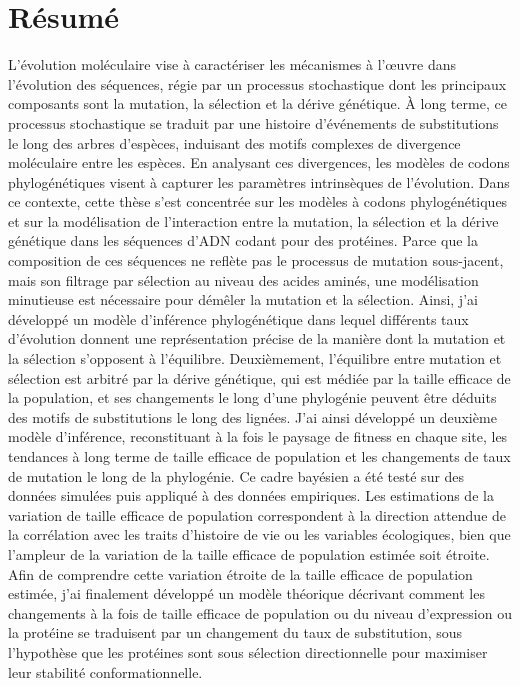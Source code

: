 \thispagestyle{empty}

\section*{Résumé}

L'évolution moléculaire vise à caractériser les mécanismes à l'œuvre dans l'évolution des séquences, régie par un processus stochastique dont les principaux composants sont la mutation, la sélection et la dérive génétique.
À long terme, ce processus stochastique se traduit par une histoire d'événements de substitutions le long des arbres d'espèces, induisant des motifs complexes de divergence moléculaire entre les espèces.
En analysant ces divergences, les modèles de codons phylogénétiques visent à capturer les paramètres intrinsèques de l'évolution.
Dans ce contexte, cette thèse s'est concentrée sur les modèles à codons phylogénétiques et sur la modélisation de l'interaction entre la mutation, la sélection et la dérive génétique dans les séquences d'ADN codant pour des protéines.
Parce que la composition de ces séquences ne reflète pas le processus de mutation sous-jacent, mais son filtrage par sélection au niveau des acides aminés, une modélisation minutieuse est nécessaire pour démêler la mutation et la sélection.
Ainsi, j'ai développé un modèle d'inférence phylogénétique dans lequel différents taux d'évolution donnent une représentation précise de la manière dont la mutation et la sélection s'opposent à l’équilibre.
Deuxièmement, l'équilibre entre mutation et sélection est arbitré par la dérive génétique, qui est médiée par la taille efficace de la population, et ses changements le long d'une phylogénie peuvent être déduits des motifs de substitutions le long des lignées.
J'ai ainsi développé un deuxième modèle d'inférence, reconstituant à la fois le paysage de fitness en chaque site, les tendances à long terme de taille efficace de population et les changements de taux de mutation le long de la phylogénie.
Ce cadre bayésien a été testé sur des données simulées puis appliqué à des données empiriques.
Les estimations de la variation de taille efficace de population correspondent à la direction attendue de la corrélation avec les traits d’histoire de vie ou les variables écologiques, bien que l'ampleur de la variation de la taille efficace de population estimée soit étroite.
Afin de comprendre cette variation étroite de la taille efficace de population estimée, j'ai finalement développé un modèle théorique décrivant comment les changements à la fois de taille efficace de population ou du niveau d'expression ou la protéine se traduisent par un changement du taux de substitution, sous l'hypothèse que les protéines sont sous sélection directionnelle pour maximiser leur stabilité conformationnelle.
